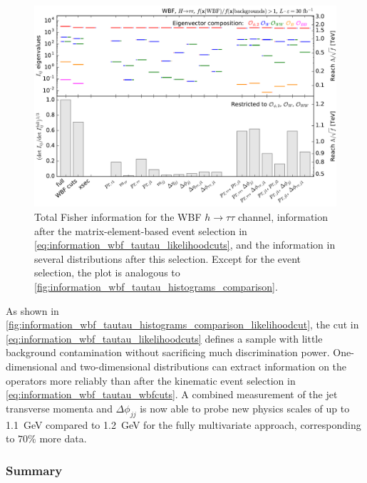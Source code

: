 \begin{figure}
  \includegraphics[width=\textwidth]{fig/information/wbf_tautau_histos_comparison_likelihoodcut}
  \caption{Total Fisher information for the WBF $h \to \tau \tau$
    channel, information after the matrix-element-based event
    selection in \autoref{eq:information_wbf_tautau_likelihoodcuts},
    and the information in several distributions after this
    selection. Except for the event selection, the plot is analogous to
    \autoref{fig:information_wbf_tautau_histograms_comparison}.}
\label{fig:information_wbf_tautau_histograms_comparison_likelihoodcut}
\end{figure}

As shown in
\autoref{fig:information_wbf_tautau_histograms_comparison_likelihoodcut},
the cut in \autoref{eq:information_wbf_tautau_likelihoodcuts} defines
a sample with little background contamination without sacrificing much
discrimination power. One-dimensional and two-dimensional
distributions can extract information on the operators more reliably
than after the kinematic event selection in
\autoref{eq:information_wbf_tautau_wbfcuts}. A combined measurement of
the jet transverse momenta and $\Delta \phi_{jj}$ is now able to probe
new physics scales of up to 1.1~GeV compared to 1.2~GeV for the fully
multivariate approach, corresponding to $70\%$ more data.



\subsubsection{Summary}

